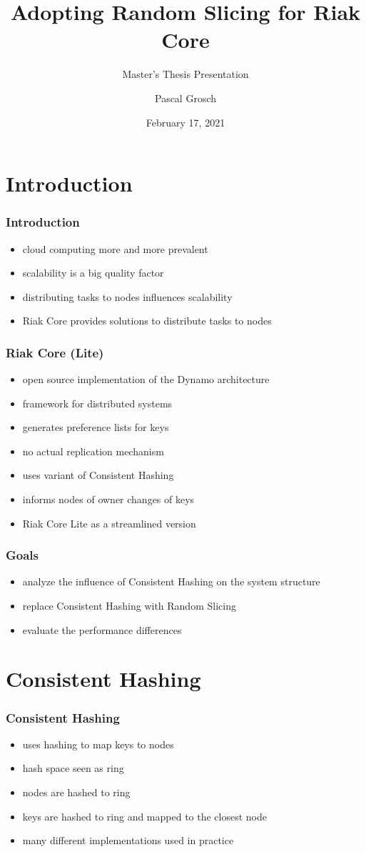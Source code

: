 \documentclass[aspectratio=169]{beamer}
\title[Master's Thesis Presentation]{Adopting Random Slicing for Riak Core}
\subtitle{Master's Thesis Presentation}
\author{Pascal Grosch}
\institute{TU Kaiserslautern}
\date{February 17, 2021}
\begin{document}
\frame{\titlepage}
\section{Introduction}
\begin{frame}
\frametitle{Introduction}
\begin{itemize}
\item cloud computing more and more prevalent
\item scalability is a big quality factor
\item distributing tasks to nodes influences scalability
\item Riak Core provides solutions to distribute tasks to nodes
\end{itemize}
\end{frame}

\begin{frame}
\frametitle{Riak Core (Lite)}
\begin{itemize}
\item open source implementation of the Dynamo architecture
\item framework for distributed systems
\item generates preference lists for keys
\item no actual replication mechanism
\item uses variant of Consistent Hashing
\item informs nodes of owner changes of keys
\item Riak Core Lite as a streamlined version
\end{itemize}
\end{frame}

\begin{frame}
\frametitle{Goals}
\begin{itemize}
\item analyze the influence of Consistent Hashing on the system structure
\item replace Consistent Hashing with Random Slicing
\item evaluate the performance differences
\end{itemize}
\end{frame}

\section{Consistent Hashing}
\begin{frame}
\frametitle{Consistent Hashing}
\begin{itemize}
\item uses hashing to map keys to nodes
\item hash space seen as ring
\item nodes are hashed to ring
\item keys are hashed to ring and mapped to the closest node
\item many different implementations used in practice
\end{itemize}
\end{frame}
\end{document}

